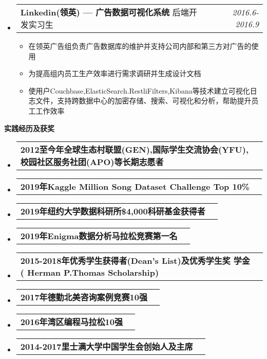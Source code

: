 \documentclass[letterpaper,10pt]{article}
\makeatletter
\newcommand{\resitem}[1]{\item #1 \vspace{-3.5pt}}
\newcommand{\resheading}[1]{{\large \colorbox{mygrey}{\begin{minipage}{\textwidth}{\textbf{#1 \vphantom{p\^{E}}}}\end{minipage}}}}
\newcommand{\ressubheading}[4]{
\begin{tabular*}{7.0in}{l@{\extracolsep{\fill}}r}
		\textbf{#1} \textit{#2}#3 & \textit{#4} \\
\end{tabular*}\vspace{-6pt}}
\makeatother
\begin{document}
\begin{itemize}
\item
	\ressubheading{Linkedin(领英) — 广告数据可视化系统}{}{后端开发实习生}{2016.6-2016.9}
	\begin{itemize}
	\setlength\itemsep{0.05em}
		\resitem{在领英广告组负责广告数据库的维护并支持公司内部和第三方对广告的使用}
		\resitem{为提高组内员工生产效率进行需求调研并生成设计文档}
		\resitem{使用户Couchbase,ElasticSearch.RestliFilters,Kibana等技术建立可视化日志文件，支持跨数据中心的加密存储、搜索、可视化和分析，帮助提升员工工作效率}
	\end{itemize}

\end{itemize}

\resheading{实践经历及获奖}
\begin{itemize}
    \setlength\itemsep{0.05em}
    \item\ressubheading{2012至今年全球生态村联盟(GEN),国际学生交流协会(YFU),校园社区服务社团(APO)等长期志愿者}{}{}{}
    \item\ressubheading{2019年Kaggle Million Song Dataset Challenge Top 10\%}{}{}{}
    \item\ressubheading{2019年纽约大学数据科研所\$4,000科研基金获得者}{}{}{}
	\item\ressubheading{2019年Enigma数据分析⻢拉松竞赛第一名}{}{}{}
	\item\ressubheading{2015-2018年优秀学生获得者(Dean’s List)及优秀学生奖
学金( Herman P.Thomas Scholarship)}{}{}{}
    \item\ressubheading{2017年德勤北美咨询案例竞赛10强}{}{}{}
    \item\ressubheading{2016年湾区编程⻢拉松10强}{}{}{}
    \item\ressubheading{2014-2017里士满大学中国学生会创始人及主席}{}{}{}
\end{itemize}
\end{document}
